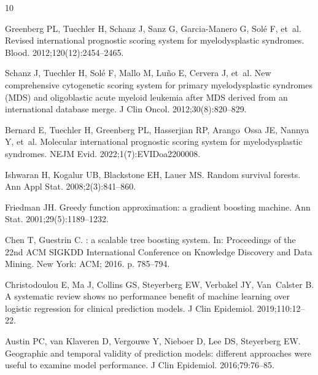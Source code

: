 \documentclass[10pt,letterpaper]{article}
\begin{document}
%
%
%
\begin{thebibliography}{10}

Greenberg PL, Tuechler H, Schanz J, Sanz G, Garcia-Manero G, Sol{\'e} F, et~al.
\newblock Revised international prognostic scoring system for myelodysplastic
  syndromes.
\newblock Blood. 2012;120(12):2454--2465.

Schanz J, Tuechler H, Sol{\'e} F, Mallo M, Lu{\~n}o E, Cervera J, et~al.
\newblock New comprehensive cytogenetic scoring system for primary
  myelodysplastic syndromes ({MDS}) and oligoblastic acute myeloid leukemia
  after {MDS} derived from an international database merge.
\newblock J Clin Oncol. 2012;30(8):820--829.

Bernard E, Tuechler H, Greenberg PL, Hasserjian RP, Arango~Ossa JE, Nannya Y,
  et~al.
\newblock Molecular international prognostic scoring system for myelodysplastic
  syndromes.
\newblock NEJM Evid. 2022;1(7):EVIDoa2200008.

Ishwaran H, Kogalur UB, Blackstone EH, Lauer MS.
\newblock Random survival forests.
\newblock Ann Appl Stat. 2008;2(3):841--860.

Friedman JH.
\newblock Greedy function approximation: a gradient boosting machine.
\newblock Ann Stat. 2001;29(5):1189--1232.

Chen T, Guestrin C.
: a scalable tree boosting system.
\newblock In: Proceedings of the 22nd ACM SIGKDD International Conference on
  Knowledge Discovery and Data Mining. New York: ACM; 2016. p. 785--794.

Christodoulou E, Ma J, Collins GS, Steyerberg EW, Verbakel JY, Van~Calster B.
\newblock A systematic review shows no performance benefit of machine learning
  over logistic regression for clinical prediction models.
\newblock J Clin Epidemiol. 2019;110:12--22.

Austin PC, van Klaveren D, Vergouwe Y, Nieboer D, Lee DS, Steyerberg EW.
\newblock Geographic and temporal validity of prediction models: different
  approaches were useful to examine model performance.
\newblock J Clin Epidemiol. 2016;79:76--85.


\end{thebibliography}
\end{document}
